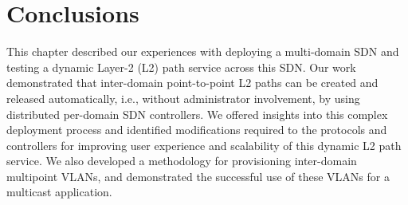 \section{Conclusions}
This chapter described our experiences with deploying a multi-domain SDN and testing
a dynamic Layer-2 (L2) path service across this SDN. Our work demonstrated that inter-domain point-to-point
L2 paths can be created and released automatically, i.e., without administrator involvement, by using distributed per-domain SDN controllers. We offered insights into this complex deployment process
and identified modifications required to the protocols and controllers
for improving user experience and scalability of this dynamic L2 path service.
We also developed a methodology for provisioning inter-domain multipoint VLANs, and demonstrated
the successful use of these VLANs for a multicast application.

